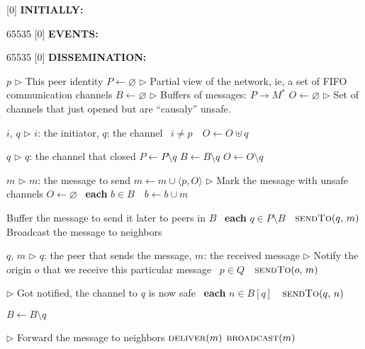 
[0] {\textbf{INITIALLY:}}

{65535}{}
[0] {\textbf{EVENTS:}}

{65535}{}
[0] {\textbf{DISSEMINATION:}}


\newcommand{\comment}[1]{$\rhd$ #1}
\newcommand{\LINEIFTHEN}[2]{%
  \algorithmicif\ {#1}\ \algorithmicthen\ {#2} %
}
\newcommand{\LINEFOR}[2]{%
  \algorithmicfor\ {#1}\ \algorithmicdo\ {#2} %
}

\begin{algorithmic}[1]

  \initially
  \State $p$ \hfill \comment{This peer identity}
  \State $P \leftarrow \varnothing$
  \hfill \comment{Partial view of the network, ie, a set of FIFO communication channels}
  \State $B \leftarrow \varnothing$ 
  \hfill \comment{Buffers of messages: $P\rightarrow M^*$ }
  \State $O \leftarrow \varnothing$
  \hfill \comment{Set of channels that just opened but are ``causaly'' unsafe.}
  \endInitially
  
  \event
   {$i$, $q$} \hfill \comment{$i$: the initiator, $q$: the channel}
  \State \LINEIFTHEN{$i \neq p$}{$O \leftarrow O \uplus q$}
  \EndFunction

  \Statex

   {$q$} \hfill \comment{$q$: the channel that closed}
  \State $P \leftarrow P \setminus q$
  \State $B \leftarrow B \setminus q$
  \State $O \leftarrow O \setminus q$
  \EndFunction

  \endEvent

  \dissemination

   {$m$} \hfill \comment{$m$: the message to send}
  \State $m \leftarrow m \cup \langle p, O\rangle$
  \hfill \comment{Mark the message with unsafe channels}
  \State $O \leftarrow \varnothing$
  \State \LINEFOR{\textbf{each} $b \in B$} {$b \leftarrow b \cup m$}
  \hfill{Buffer the message to send it later to peers in $B$}
  \State \LINEFOR{\textbf{each} $q \in P \setminus B$} 
  {$\textsc{sendTo}(q,\, m)$} \hfill{Broadcast the message to neighbors}
  \EndFunction

  \Statex

   {$q$, $m$}
  \hfill \comment{$q$: the peer that sends the message, $m$: the received message}
  \hfill \comment{Notify the origin $o$ that we receive this particular message}
  \State \LINEIFTHEN {$p \in Q$} {$\textsc{sendTo}(o, \, m)$}
  \EndFor
  
  \hfill \comment{Got notified, the channel to $q$ is now safe}
  \State \LINEFOR {\textbf{each} $n \in B[q]$} {$\textsc{sendTo}(q,\, n)$}
  \State $B \leftarrow B \setminus q$
  \EndIf
  
  \hfill \comment{Forward the message to neighbors}
  \State $\textsc{deliver}(m)$
  \State $\textsc{broadcast}(m)$
  \EndIf

  \EndFunction

\end{algorithmic}


